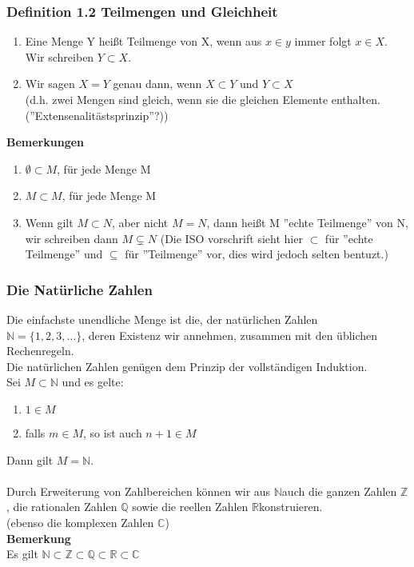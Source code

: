 \documentclass{scrartcl}
\newcommand{\N}{\mathbb{N}}
\newcommand{\mR}{\(\mathbb{R}\)}
\newcommand{\mN}{\(\mathbb{N}\)}
\begin{document}
\subsubsection{Definition 1.2 Teilmengen und Gleichheit}
\begin{enumerate}
\item{Eine Menge Y hei\ss{}t Teilmenge von X, wenn aus \(x \in y\) immer folgt \(x \in X\). Wir schreiben \(Y \subset X\).}
\item{Wir sagen \(X=Y\) genau dann, wenn \(X \subset Y\) und \(Y \subset X\)\\
(d.h. zwei Mengen sind gleich, wenn sie die gleichen Elemente enthalten. (''Extensenalit\"astsprinzip''?))}
\end{enumerate}
\textbf{Bemerkungen}
\begin{enumerate}
\item{\(\emptyset \subset M\), f\"ur jede Menge M}
\item{\(M \subset M\), f\"ur jede Menge M}
\item{Wenn gilt \(M \subset N\), aber nicht \(M = N\), dann hei\ss{}t M ''echte Teilmenge'' von N, wir schreiben dann \(M \subsetneq N\) (Die ISO vorschrift sieht hier \(\subset\) f\"ur ''echte Teilmenge'' und \(\subseteq\) f\"ur ''Teilmenge'' vor, dies wird jedoch selten bentuzt.)}
\end{enumerate}

\subsubsection{Die Nat\"urliche Zahlen}
Die einfachste unendliche Menge ist die, der nat\"urlichen Zahlen\\
\(\N = \{1, 2, 3, \dots\}\), deren Existenz wir annehmen, zusammen mit den \"ublichen Rechenregeln.\\
Die nat\"urlichen Zahlen gen\"ugen dem Prinzip der vollst\"andigen Induktion.\\
Sei \(M \subset \N\) und es gelte:
\begin{enumerate}
\item{\(1 \in M\)}
\item{falls \(m \in M\), so ist auch \(n + 1 \in M\)}
\end{enumerate}
Dann gilt \(M = \N\).\\
\\
Durch Erweiterung von Zahlbereichen k\"onnen wir aus \mN auch die ganzen Zahlen \(\mathbb{Z}\), die rationalen Zahlen \(\mathbb{Q}\) sowie die reellen Zahlen \mR konstruieren.\\
(ebenso die komplexen Zahlen \(\mathbb{C}\))\\
\textbf{Bemerkung}\\
Es gilt \(\N \subset \mathbb{Z} \subset \mathbb{Q} \subset \mathbb{R} \subset \mathbb{C}\)\\
\end{document}
